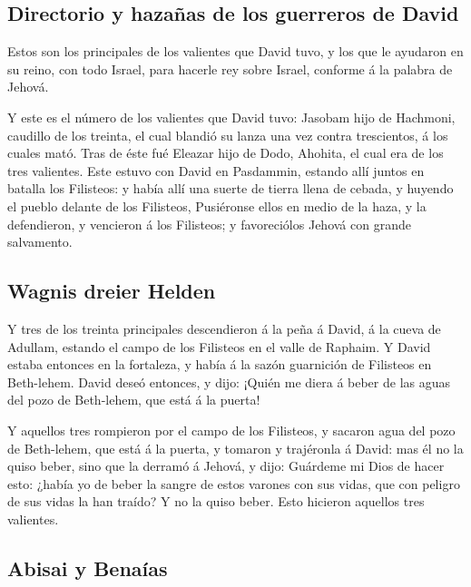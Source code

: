 \hypertarget{directorio-y-hazauxf1as-de-los-guerreros-de-david}{%
\subsection{Directorio y hazañas de los guerreros de
David}\label{directorio-y-hazauxf1as-de-los-guerreros-de-david}}

 Estos son los principales de los valientes que David
tuvo, y los que le ayudaron en su reino, con todo Israel, para hacerle
rey sobre Israel, conforme á la palabra de Jehová.

 Y este es el número de los valientes que David tuvo:
Jasobam hijo de Hachmoni, caudillo de los treinta, el cual blandió su
lanza una vez contra trescientos, á los cuales mató. 
Tras de éste fué Eleazar hijo de Dodo, Ahohita, el cual era de los tres
valientes.  Este estuvo con David en Pasdammin, estando
allí juntos en batalla los Filisteos: y había allí una suerte de tierra
llena de cebada, y huyendo el pueblo delante de los Filisteos,
 Pusiéronse ellos en medio de la haza, y la defendieron,
y vencieron á los Filisteos; y favoreciólos Jehová con grande
salvamento.

\hypertarget{wagnis-dreier-helden}{%
\subsection{Wagnis dreier Helden}\label{wagnis-dreier-helden}}

 Y tres de los treinta principales descendieron á la peña
á David, á la cueva de Adullam, estando el campo de los Filisteos en el
valle de Raphaim.  Y David estaba entonces en la
fortaleza, y había á la sazón guarnición de Filisteos en Beth-lehem.
 David deseó entonces, y dijo: ¡Quién me diera á beber de
las aguas del pozo de Beth-lehem, que está á la puerta!

 Y aquellos tres rompieron por el campo de los Filisteos,
y sacaron agua del pozo de Beth-lehem, que está á la puerta, y tomaron y
trajéronla á David: mas él no la quiso beber, sino que la derramó á
Jehová, y dijo:  Guárdeme mi Dios de hacer esto: ¿había
yo de beber la sangre de estos varones con sus vidas, que con peligro de
sus vidas la han traído? Y no la quiso beber. Esto hicieron aquellos
tres valientes.

\hypertarget{abisai-y-benauxedas}{%
\subsection{Abisai y Benaías}\label{abisai-y-benauxedas}}

